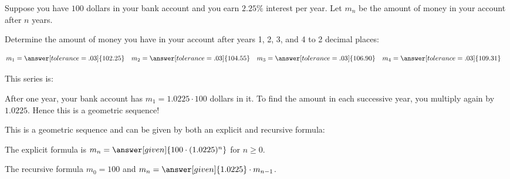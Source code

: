 \documentclass{ximera}
\author{Jim Talamo and Bart Snapp}
\begin{document}
\begin{exercise}

  Suppose you have $100$ dollars in your bank account and you earn
  $2.25\%$ interest per year. Let $m_n$ be the amount of money in your
  account after $n$ years. 
  
  Determine the amount of money you have in your account after years 1, 2, 3, and 4 to 2 decimal places:
  
  \begin{align*}
m_1&= \answer[tolerance=.03]{102.25} &m_2&= \answer[tolerance=.03]{104.55} &m_3&= \answer[tolerance=.03]{106.90} &m_4&= \answer[tolerance=.03]{109.31} &
\end{align*}
  
\begin{exercise}
This series is:
\begin{multipleChoice}
\end{multipleChoice}

\begin{hint}
    After one year, your bank account has $m_1 = 1.0225\cdot 100$ dollars
    in it. To find the amount in each successive year, you multiply
    again by $1.0225$. Hence this is a geometric sequence!
\end{hint}

This is a geometric sequence and can be given by both an explicit and recursive formula:

\begin{exercise}
The explicit formula is $m_n = \answer[given]{100 \cdot (1.0225)^n}$ for $n \geq 0$. 
\end{exercise}

\begin{exercise}
The recursive formula $m_0 = 100$ and $m_n =
    \answer[given]{1.0225}\cdot m_{n-1}$.
\end{exercise}
\end{exercise}
\end{exercise}
\end{document}
